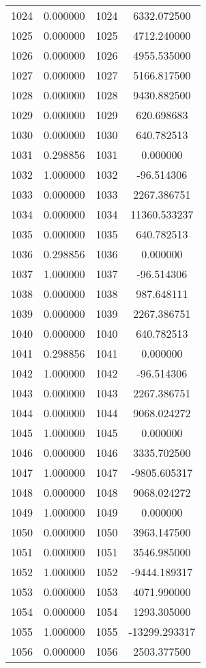 \documentclass[12pt]{article}
\begin{document}
\begin{longtable}{@{}cccc@{}}
1024 & 0.000000 & 1024 & 6332.072500 \\
1025 & 0.000000 & 1025 & 4712.240000 \\
1026 & 0.000000 & 1026 & 4955.535000 \\
1027 & 0.000000 & 1027 & 5166.817500 \\
1028 & 0.000000 & 1028 & 9430.882500 \\
1029 & 0.000000 & 1029 & 620.698683 \\
1030 & 0.000000 & 1030 & 640.782513 \\
1031 & 0.298856 & 1031 & 0.000000 \\
1032 & 1.000000 & 1032 & -96.514306 \\
1033 & 0.000000 & 1033 & 2267.386751 \\
1034 & 0.000000 & 1034 & 11360.533237 \\
1035 & 0.000000 & 1035 & 640.782513 \\
1036 & 0.298856 & 1036 & 0.000000 \\
1037 & 1.000000 & 1037 & -96.514306 \\
1038 & 0.000000 & 1038 & 987.648111 \\
1039 & 0.000000 & 1039 & 2267.386751 \\
1040 & 0.000000 & 1040 & 640.782513 \\
1041 & 0.298856 & 1041 & 0.000000 \\
1042 & 1.000000 & 1042 & -96.514306 \\
1043 & 0.000000 & 1043 & 2267.386751 \\
1044 & 0.000000 & 1044 & 9068.024272 \\
1045 & 1.000000 & 1045 & 0.000000 \\
1046 & 0.000000 & 1046 & 3335.702500 \\
1047 & 1.000000 & 1047 & -9805.605317 \\
1048 & 0.000000 & 1048 & 9068.024272 \\
1049 & 1.000000 & 1049 & 0.000000 \\
1050 & 0.000000 & 1050 & 3963.147500 \\
1051 & 0.000000 & 1051 & 3546.985000 \\
1052 & 1.000000 & 1052 & -9444.189317 \\
1053 & 0.000000 & 1053 & 4071.990000 \\
1054 & 0.000000 & 1054 & 1293.305000 \\
1055 & 1.000000 & 1055 & -13299.293317 \\
1056 & 0.000000 & 1056 & 2503.377500 \\

\end{longtable}
\end{document}
